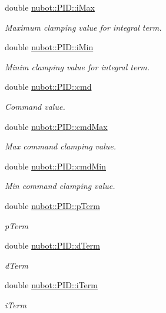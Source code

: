 \begin{DoxyCompactItemize}
double \hyperlink{group__gazebo__common_ga23926b1473b7ad4cbbd9fb565b94712e}{nubot\-::\-P\-I\-D\-::i\-Max}
\begin{DoxyCompactList}\small\item\em Maximum clamping value for integral term. \end{DoxyCompactList}\item 
double \hyperlink{group__gazebo__common_gaabd36c7c162217550544931b749e4a7e}{nubot\-::\-P\-I\-D\-::i\-Min}
\begin{DoxyCompactList}\small\item\em Minim clamping value for integral term. \end{DoxyCompactList}\item 
double \hyperlink{group__gazebo__common_ga756c5fabaf2421e05302b93e9ef248a7}{nubot\-::\-P\-I\-D\-::cmd}
\begin{DoxyCompactList}\small\item\em Command value. \end{DoxyCompactList}\item 
double \hyperlink{group__gazebo__common_ga2a4e5aac90ab72833c48b1f7f06313a6}{nubot\-::\-P\-I\-D\-::cmd\-Max}
\begin{DoxyCompactList}\small\item\em Max command clamping value. \end{DoxyCompactList}\item 
double \hyperlink{group__gazebo__common_ga887cadc64650fbd326b05c081141603f}{nubot\-::\-P\-I\-D\-::cmd\-Min}
\begin{DoxyCompactList}\small\item\em Min command clamping value. \end{DoxyCompactList}\item 
double \hyperlink{group__gazebo__common_gac209a483d85ab0a198d36709dd0d089d}{nubot\-::\-P\-I\-D\-::p\-Term}
\begin{DoxyCompactList}\small\item\em p\-Term \end{DoxyCompactList}\item 
double \hyperlink{group__gazebo__common_ga5b1af456567f8c17b81d4be70dbb1bb1}{nubot\-::\-P\-I\-D\-::d\-Term}
\begin{DoxyCompactList}\small\item\em d\-Term \end{DoxyCompactList}\item 
double \hyperlink{group__gazebo__common_gad05e98c72f5396f4bd32e729ede59ad1}{nubot\-::\-P\-I\-D\-::i\-Term}
\begin{DoxyCompactList}\small\item\em i\-Term \end{DoxyCompactList}\end{DoxyCompactItemize}


